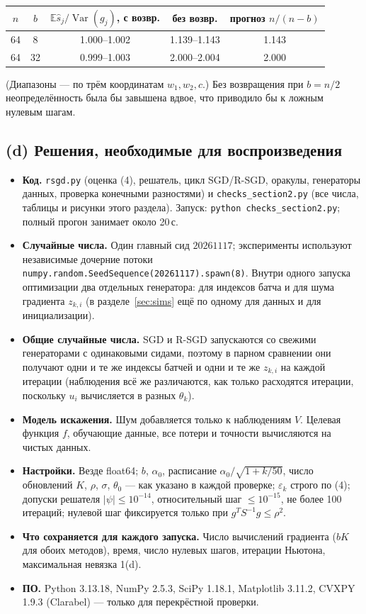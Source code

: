 \documentclass[11pt,a4paper]{article}
\newcommand{\E}{\mathbb{E}}
\DeclareMathOperator{\Var}{Var}
\begin{document}
\begin{center}
\begin{tabular}{@{}ccccc@{}}
\toprule
$n$ & $b$ & $\E\widehat s_j/\Var(g_j)$, с возвр. & без возвр. & прогноз $n/(n-b)$ \\
\midrule
64 & 8 & 1.000--1.002 & 1.139--1.143 & 1.143 \\
64 & 32 & 0.999--1.003 & 2.000--2.004 & 2.000 \\
\bottomrule
\end{tabular}
\end{center}
(Диапазоны — по трём координатам $w_1,w_2,c$.) Без возвращения при $b=n/2$
неопределённость была бы завышена вдвое, что приводило бы к ложным нулевым шагам.

\subsection{(d) Решения, необходимые для воспроизведения}\label{sec:repro2}

\begin{itemize}
\item \textbf{Код.} \texttt{rsgd.py} (оценка (4), решатель, цикл SGD/R-SGD, оракулы,
генераторы данных, проверка конечными разностями) и \texttt{checks\_section2.py} (все
числа, таблицы и рисунки этого раздела). Запуск: \texttt{python checks\_section2.py};
полный прогон занимает около 20\,с.
\item \textbf{Случайные числа.} Один главный сид $20261117$; эксперименты используют
независимые дочерние потоки \texttt{numpy.random.SeedSequence(20261117).spawn(8)}.
Внутри одного запуска оптимизации два отдельных генератора: для индексов батча и для
шума градиента $z_{k,i}$ (в разделе~\ref{sec:sims} ещё по одному для данных и для инициализации).
\item \textbf{Общие случайные числа.} SGD и R-SGD запускаются со свежими генераторами с
одинаковыми сидами, поэтому в парном сравнении они получают одни и те же индексы батчей и
одни и те же $z_{k,i}$ на каждой итерации (наблюдения всё же различаются, как только
расходятся итерации, поскольку $u_i$ вычисляется в разных $\theta_k$).
\item \textbf{Модель искажения.} Шум добавляется только к наблюдениям $V$. Целевая
функция $f$, обучающие данные, все потери и точности вычисляются на чистых данных.
\item \textbf{Настройки.} Везде float64; $b$, $\alpha_0$, расписание
$\alpha_0/\sqrt{1+k/50}$, число обновлений $K$, $\rho$, $\sigma$, $\theta_0$ — как указано
в каждой проверке; $\varepsilon_k$ строго по (4); допуски решателя $|\psi|\le10^{-14}$,
относительный шаг $\le10^{-15}$, не более 100 итераций; нулевой шаг фиксируется только
при $g^TS^{-1}g\le\rho^2$.
\item \textbf{Что сохраняется для каждого запуска.} Число вычислений градиента ($bK$ для
обоих методов), время, число нулевых шагов, итерации Ньютона, максимальная невязка 1(d).
\item \textbf{ПО.} Python 3.13.18, NumPy 2.5.3, SciPy 1.18.1, Matplotlib 3.11.2,
CVXPY 1.9.3 (Clarabel) — только для перекрёстной проверки.
\end{itemize}
\end{document}
